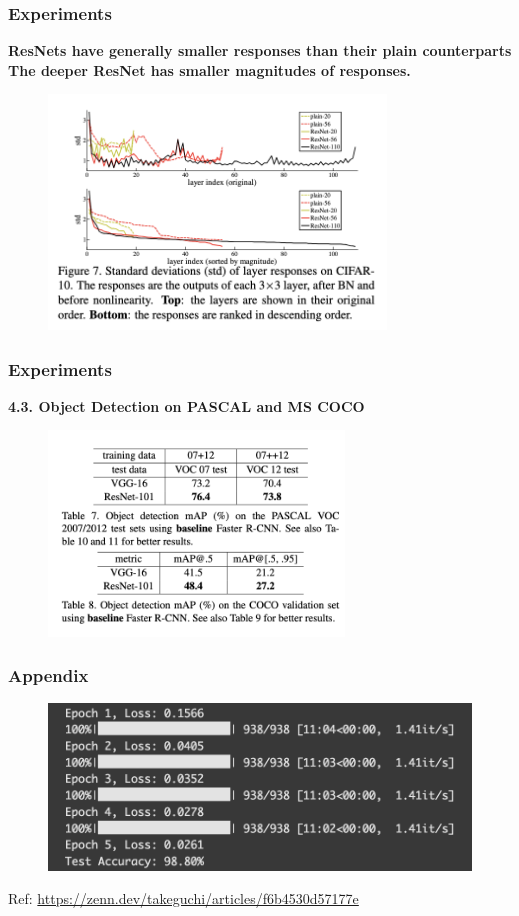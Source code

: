 \documentclass[
	11pt, %
]{beamer}
\begin{document}
\begin{frame}
	\frametitle{Experiments}

	\textbf{ResNets have generally smaller responses than their plain counterparts}\\
	\textbf{The deeper ResNet has smaller magnitudes of responses.}

	\begin{figure}
		\centering
		\includegraphics[width=0.8\textwidth]{./images/Screenshot 2025-05-20 at 0.42.53.png}
	\end{figure}
\end{frame}

\begin{frame}
	\frametitle{Experiments}

	\textbf{4.3. Object Detection on PASCAL and MS COCO} 

	\begin{figure}
		\centering
		\includegraphics[width=0.7\textwidth]{./images/Screenshot 2025-05-20 at 0.44.13.png}
	\end{figure}
\end{frame}

\begin{frame}
	\frametitle{Appendix}

	\begin{figure}
		\centering
		\includegraphics[width=\textwidth]{./images/Screenshot 2025-05-20 at 9.51.40.png}
	\end{figure}

	Ref: \url{https://zenn.dev/takeguchi/articles/f6b4530d57177e}
\end{frame}
\end{document}
